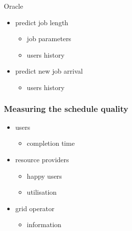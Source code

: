 {
\begin{frame}
\begin{block}{Oracle}
	\begin{itemize}
		\item predict job length
		\begin{itemize}
			\item job parameters
			\item users history
		\end{itemize} \pause
		\item predict new job arrival
		\begin{itemize}
			\item users history
		\end{itemize}
	\end{itemize}
\end{block}
\end{frame}
}

\begin{frame}
	\frametitle{Measuring the schedule quality}
	\begin{itemize}
	\item users
		\begin{itemize}
			\item completion time
		\end{itemize}
\pause
	\item resource providers
		\begin{itemize}
			\item{happy users}
			\item{utilisation}
		\end{itemize}
\pause
	\item grid operator
		\begin{itemize}
			\item information
		\end{itemize}
	\end{itemize}
\end{frame}

